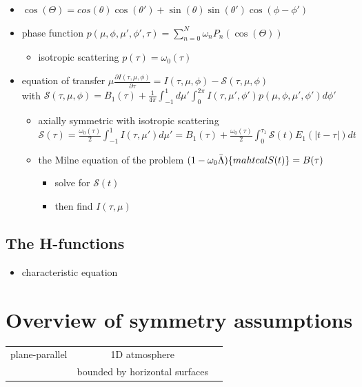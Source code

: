 \documentclass[../main/main.tex]{subfiles}
\begin{document}
\begin{itemize}

\item $\cos(\Theta) = cos(\theta)\cos(\theta') + \sin(\theta)\sin(\theta') \cos(\phi-\phi')$

\item phase function $\boxed{p(\mu,\phi,\mu',\phi',\tau) = \sum_{n=0}^N \omega_n P_n(\cos(\Theta))}$
\begin{itemize}

\item isotropic scattering $p(\tau) = \omega_0(\tau)$
\end{itemize}

\item equation of transfer $\boxed{\mu \frac{\partial I(\tau,\mu,\phi)}{\partial \tau} = I(\tau,\mu,\phi) - \mathcal{S}(\tau,\mu,\phi)}$ 
\\ with $\mathcal{S}(\tau,\mu,\phi) = B_1(\tau) + \frac{1}{4 \pi} \int_{-1}^{1} d\mu' \int_0^{2\pi} I(\tau,\mu',\phi') p(\mu,\phi,\mu',\phi') d\phi'$
\begin{itemize}
\item axially symmetric with isotropic scattering \\
$\mathcal{S}(\tau) = \frac{\omega_0(\tau)}{2} \int_{-1}^{1} I(\tau,\mu') d\mu' = 
B_1(\tau) + \frac{\omega_0(\tau)}{2} \int_0^{\tau_1} \mathcal{S} (t) E_1(|t-\tau|)dt $
\item the Milne equation of the problem $(1-\omega_0 \bar{\Lambda})\{ \\mahtcal{S}(t)\} = B(\tau)$
\begin{itemize}
\item solve for $\mathcal{S}(t)$
\item then find $I(\tau,\mu)$
\end{itemize}

\end{itemize}
\end{itemize}

\subsection{The H-functions}
\begin{itemize}
\item characteristic equation
\end{itemize}



\newpage
\section{Overview of symmetry assumptions}
\begin{center}
\centering
{\tabulinesep=1.5mm
\begin{tabu}{|c|c|c|}
\hline 
plane-parallel & 1D atmosphere & \\ 
& bounded by horizontal surfaces & \\ \hline

\end{tabu}}
\end{center}
\end{document}
